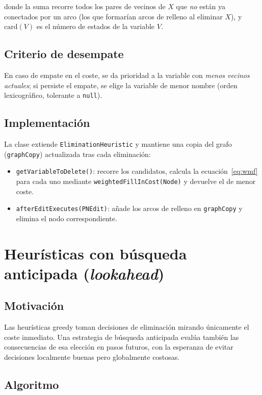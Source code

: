 \documentclass[11pt, a4paper]{article}
\begin{document}
donde la suma recorre todos los pares de vecinos de $X$ que \emph{no} están ya conectados por un arco (los que formarían arcos de relleno al eliminar $X$), y $\mathrm{card}(V)$ es el número de estados de la variable $V$.

\subsection{Criterio de desempate}

En caso de empate en el coste, se da prioridad a la variable con \emph{menos vecinos actuales}; si persiste el empate, se elige la variable de menor nombre (orden lexicográfico, tolerante a \texttt{null}).

\subsection{Implementación}

La clase extiende \texttt{EliminationHeuristic} y mantiene una copia del grafo (\texttt{graphCopy}) actualizada tras cada eliminación:

\begin{itemize}
  \item \texttt{getVariableToDelete()}: recorre los candidatos, calcula la ecuación~\eqref{eq:wmf} para cada uno mediante \texttt{weightedFillInCost(Node)} y devuelve el de menor coste.
  \item \texttt{afterEditExecutes(PNEdit)}: añade los arcos de relleno en \texttt{graphCopy} y elimina el nodo correspondiente.
\end{itemize}

\section{Heurísticas con búsqueda anticipada (\emph{lookahead})}
\label{sec:lookahead}

\subsection{Motivación}

Las heurísticas greedy toman decisiones de eliminación mirando únicamente el coste inmediato. Una estrategia de búsqueda anticipada evalúa también las consecuencias de esa elección en pasos futuros, con la esperanza de evitar decisiones localmente buenas pero globalmente costosas.

\subsection{Algoritmo}
\end{document}
